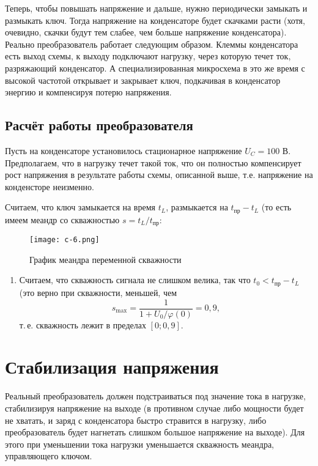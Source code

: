 \documentclass{letask}
\begin{document}
Теперь, чтобы повышать напряжение и дальше, нужно периодически замыкать и размыкать ключ. Тогда напряжение на конденсаторе будет скачками расти (хотя, очевидно, скачки будут тем слабее, чем больше напряжение конденсатора). Реально преобразователь работает следующим образом. Клеммы конденсатора есть выход схемы, к выходу подключают нагрузку, через которую течет ток, разряжающий конденсатор. А специализированная микросхема в это же время с высокой частотой открывает и закрывает ключ, подкачивая в конденсатор энергию и компенсируя потерю напряжения.\\

\subsection*{Расчёт работы преобразователя}

Пусть на конденсаторе установилось стационарное напряжение $U_C = 100$ В. Предполагаем, что в нагрузку течет такой ток, что он полностью компенсирует рост напряжения в результате работы схемы, описанной выше, т.е. напряжение на конденсторе неизменно.

Считаем, что ключ замыкается на время $t_L$, размыкается на $t_\text{пр} - t_L$ (то есть имеем меандр со скважностью $s = t_L/t_\text{пр}$:

\begin{figure}[H]
\centering
\texttt{[image: c-6.png]}
\caption{График меандра переменной скважности}
\end{figure}

\begin{enumerate}[resume]

\item Считаем, что скважность сигнала не слишком велика, так что $t_0 < t_\text{пр} - t_L$ (это верно при скважности, меньшей, чем 
$$ s_{\max} = \frac{1}{1+U_0/\varphi(0)} = 0,9,$$
т.\,е. скважность лежит в пределах $[0; 0,9]$. 



\end{enumerate}

\section*{Стабилизация напряжения}

Реальный преобразователь должен подстраиваться под значение тока в нагрузке, стабилизируя напряжение на выходе (в противном случае либо мощности будет не хватать, и заряд с конденсатора быстро стравится в нагрузку, либо преобразователь будет нагнетать слишком большое напряжение на выходе). Для этого при уменьшении тока нагрузки уменьшается скважность меандра, управляющего ключом.
\end{document}
